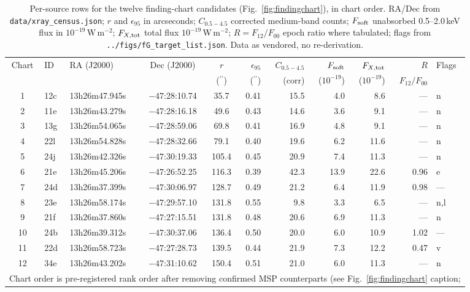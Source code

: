 \documentclass[11pt]{article}
\newcommand{\as}{\ensuremath{^{\prime\prime}}}
\begin{document}
\begin{table}[htbp]
\centering
\small
\caption{Per-source rows for the twelve finding-chart candidates (Fig.~\ref{fig:findingchart}), in chart order. RA/Dec from \texttt{data/xray\_census.json}; $r$ and $\epsilon_{95}$ in arcseconds; $C_{0.5-4.5}$ corrected medium-band counts; $F_{\rm soft}$ unabsorbed 0.5--2.0\,keV flux in $10^{-19}$\,W\,m$^{-2}$; $F_{X,{\rm tot}}$ total flux $10^{-19}$\,W\,m$^{-2}$; $R=F_{12}/F_{00}$ epoch ratio where tabulated; flags from \texttt{../figs/fG\_target\_list.json}. Data as vendored, no re-derivation.}
\label{tab:twelve}
\footnotesize
\begin{tabular}{cllccrrrrrl}
\toprule
Chart & ID & RA (J2000) & Dec (J2000) & $r$ & $\epsilon_{95}$ & $C_{0.5-4.5}$ & $F_{\rm soft}$ & $F_{X,{\rm tot}}$ & $R$ & Flags \\
 & & & & (\as) & (\as) & (corr) & ($10^{-19}$) & ($10^{-19}$) & $F_{12}/F_{00}$ & \\
\midrule
1 & 12c & 13h26m47.945s & $-47$:28:10.74 & 35.7 & 0.41 & 15.5 & 4.0 & 8.6 & --- & n \\
2 & 11e & 13h26m43.279s & $-47$:28:16.18 & 49.6 & 0.43 & 14.6 & 3.6 & 9.1 & --- & n \\
3 & 13g & 13h26m54.065s & $-47$:28:59.06 & 69.8 & 0.41 & 16.9 & 4.8 & 9.1 & --- & n \\
4 & 22l & 13h26m54.828s & $-47$:28:32.66 & 79.1 & 0.40 & 19.6 & 6.2 & 11.6 & --- & n \\
5 & 24j & 13h26m42.326s & $-47$:30:19.33 & 105.4 & 0.45 & 20.9 & 7.4 & 11.3 & --- & n \\
6 & 21e & 13h26m45.206s & $-47$:26:52.25 & 116.3 & 0.39 & 42.3 & 13.9 & 22.6 & 0.96 & e \\
7 & 24d & 13h26m37.399s & $-47$:30:06.97 & 128.7 & 0.49 & 21.2 & 6.4 & 11.9 & 0.98 & --- \\
8 & 23e & 13h26m58.174s & $-47$:29:57.10 & 131.8 & 0.55 & 9.8 & 3.3 & 6.5 & --- & n,l \\
9 & 21f & 13h26m37.860s & $-47$:27:15.51 & 131.8 & 0.48 & 20.6 & 6.9 & 11.3 & --- & n \\
10 & 24b & 13h26m39.312s & $-47$:30:37.06 & 136.4 & 0.50 & 20.0 & 6.0 & 10.9 & 1.02 & --- \\
11 & 22d & 13h26m58.723s & $-47$:27:28.73 & 139.5 & 0.44 & 21.9 & 7.3 & 12.2 & 0.47 & v \\
12 & 34e & 13h26m43.202s & $-47$:31:10.62 & 150.4 & 0.51 & 21.0 & 6.0 & 11.3 & --- & n \\
\bottomrule
\multicolumn{11}{l}{\footnotesize Chart order is pre-registered rank order after removing confirmed MSP counterparts (see Fig.~\ref{fig:findingchart} caption;} \\

\end{tabular}
\end{table}
\end{document}

